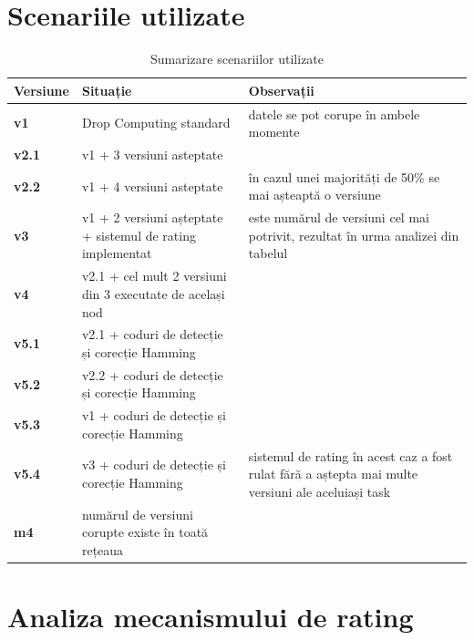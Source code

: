 \documentclass[12pt,a4paper]{report}
\begin{document}
\section{Scenariile utilizate} \label{scenariiUtilizate}

\begin{table}[th]\small\linespread{1}
\caption{Sumarizare scenariilor utilizate}
\label{tab:scenarii}
\begin{tabular}{l >{\raggedright\arraybackslash}p{8cm} >{\raggedright\arraybackslash}p{4cm}}
\textbf{Versiune} & \textbf{Situație} & \textbf{Observații} \\\hline
\textbf{v1} & Drop Computing standard &datele se pot corupe în ambele momente \\\hline
\textbf{v2.1} & v1 + 3 versiuni asteptate& \\\hline
\textbf{v2.2} & v1 + 4 versiuni asteptate &în cazul unei majorități de 50\% se mai așteaptă o versiune \\\hline
\textbf{v3} & v1 + 2 versiuni așteptate + sistemul de rating implementat &2 este numărul de versiuni cel mai potrivit, rezultat în urma analizei din tabelul  \\\hline
\textbf{v4} & v2.1 + cel mult 2 versiuni din 3 executate de același nod& \\\hline
\textbf{v5.1} & v2.1 + coduri de detecție și corecție Hamming& \\\hline
\textbf{v5.2} & v2.2 + coduri de detecție și corecție Hamming& \\\hline
\textbf{v5.3} & v1 + coduri de detecție și corecție Hamming& \\\hline
\textbf{v5.4} & v3 + coduri de detecție și corecție Hamming& sistemul de rating în acest caz a fost rulat fără a aștepta mai multe versiuni ale aceluiași task \\\hline
\textbf{m4} & numărul de versiuni corupte existe în toată rețeaua &\\
\hline
\end{tabular}
\end{table}
\newpage
\section{Analiza mecanismului de rating}
\end{document}
